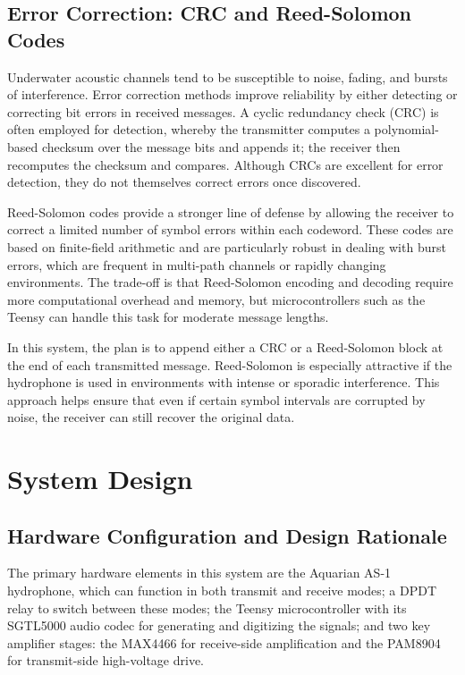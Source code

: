\section{Error Correction: CRC and Reed-Solomon Codes}

Underwater acoustic channels tend to be susceptible to noise, fading, and bursts of interference. Error correction methods improve reliability by either detecting or correcting bit errors in received messages. A cyclic redundancy check (CRC) is often employed for detection, whereby the transmitter computes a polynomial-based checksum over the message bits and appends it; the receiver then recomputes the checksum and compares. Although CRCs are excellent for error detection, they do not themselves correct errors once discovered.

Reed-Solomon codes provide a stronger line of defense by allowing the receiver to correct a limited number of symbol errors within each codeword. These codes are based on finite-field arithmetic and are particularly robust in dealing with burst errors, which are frequent in multi-path channels or rapidly changing environments. The trade-off is that Reed-Solomon encoding and decoding require more computational overhead and memory, but microcontrollers such as the Teensy can handle this task for moderate message lengths. 

In this system, the plan is to append either a CRC or a Reed-Solomon block at the end of each transmitted message. Reed-Solomon is especially attractive if the hydrophone is used in environments with intense or sporadic interference. This approach helps ensure that even if certain symbol intervals are corrupted by noise, the receiver can still recover the original data.

\chapter{System Design}

\section{Hardware Configuration and Design Rationale}

The primary hardware elements in this system are the Aquarian AS-1 hydrophone, which can function in both transmit and receive modes; a DPDT relay to switch between these modes; the Teensy microcontroller with its SGTL5000 audio codec for generating and digitizing the signals; and two key amplifier stages: the MAX4466 for receive-side amplification and the PAM8904 for transmit-side high-voltage drive. 

